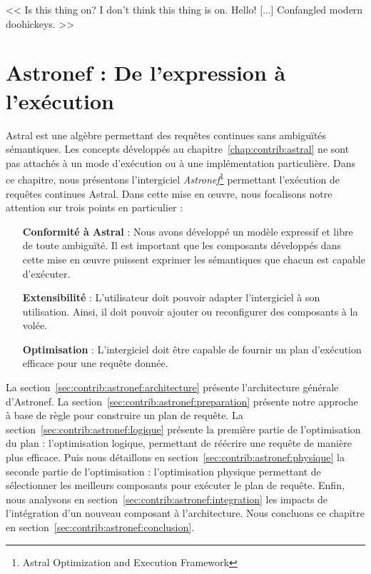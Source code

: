 \begin{savequote}[6cm]
<< Is this thing on? I don't think this thing is on. Hello! [...] Confangled modern doohickeys. >>
\end{savequote}

\chapter{Astronef : De l'expression à l'exécution}\label{chap:contrib:astronef}
\chaptertoc

Astral est une algèbre permettant des requêtes continues sans ambiguïtés sémantiques. Les concepts développés au chapitre~\ref{chap:contrib:astral} ne sont pas attachés à un mode d'exécution ou à une implémentation particulière. Dans ce chapitre, nous présentons l'intergiciel \textit{Astronef}\footnote{Astral Optimization and Execution Framework} permettant l'exécution de requêtes continues Astral. Dans cette mise en œuvre, nous focalisons notre attention sur trois points en particulier :
\begin{itemize}
	\item[\textbf{Conformité à Astral}] : Nous avons développé un modèle expressif et libre de toute ambiguïté. Il est important que les composants développés dans cette mise en œuvre puissent exprimer les sémantiques que chacun est capable d'exécuter.
	\item[\textbf{Extensibilité}] : L'utilisateur doit pouvoir adapter l'intergiciel à son utilisation. Ainsi, il doit pouvoir ajouter ou reconfigurer des composants à la volée.
	\item[\textbf{Optimisation}] : L'intergiciel doit être capable de fournir un plan d'exécution efficace pour une requête donnée.
\end{itemize}

La section~\ref{sec:contrib:astronef:architecture} présente l'architecture générale d'Astronef. La section~\ref{sec:contrib:astronef:preparation} présente notre approche à base de règle pour construire un plan de requête. La section~\ref{sec:contrib:astronef:logique} présente la première partie de l'optimisation du plan : l'optimisation logique, permettant de réécrire une requête de manière plus efficace. Puis nous détaillons en section~\ref{sec:contrib:astronef:physique} la seconde partie de l'optimisation : l'optimisation physique permettant de sélectionner les meilleurs composants pour exécuter le plan de requête. Enfin, nous analysons en section~\ref{sec:contrib:astronef:integration} les impacts de l'intégration d'un nouveau composant à l'architecture. Nous concluons ce chapitre en section~\ref{sec:contrib:astronef:conclusion}.

\lstset{language=PrologAstral}






